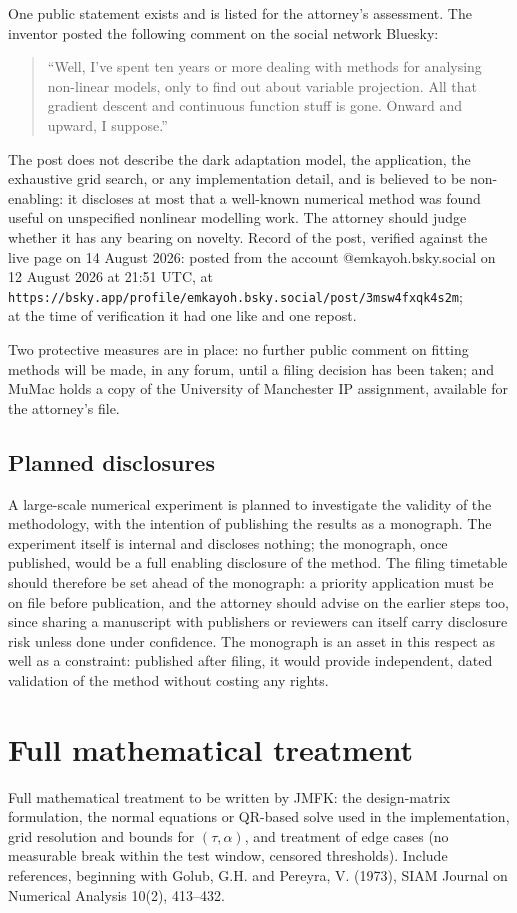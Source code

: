 \documentclass[11pt,a4paper]{article}
\begin{document}
One public statement exists and is listed for the attorney's assessment.
The inventor posted the following comment on the social network Bluesky:
\begin{quote}
``Well, I've spent ten years or more dealing with methods for analysing
non-linear models, only to find out about variable projection. All that
gradient descent and continuous function stuff is gone. Onward and
upward, I suppose.''
\end{quote}
The post does not describe the dark adaptation model, the application,
the exhaustive grid search, or any implementation detail, and is believed
to be non-enabling: it discloses at most that a well-known numerical
method was found useful on unspecified nonlinear modelling work. The
attorney should judge whether it has any bearing on novelty. Record of
the post, verified against the live page on 14 August 2026: posted from
the account @emkayoh.bsky.social on 12 August 2026 at 21:51 UTC, at\\
\texttt{\small https://bsky.app/profile/emkayoh.bsky.social/post/3msw4fxqk4s2m};\\
at the time of verification it had one like and one repost.

Two protective measures are in place: no further public comment on
fitting methods will be made, in any forum, until a filing decision has
been taken; and MuMac holds a copy of the University of Manchester IP
assignment, available for the attorney's file.

\subsection{Planned disclosures}
A large-scale numerical experiment is planned to investigate the validity
of the methodology, with the intention of publishing the results as a
monograph. The experiment itself is internal and discloses nothing; the
monograph, once published, would be a full enabling disclosure of the
method. The filing timetable should therefore be set ahead of the
monograph: a priority application must be on file before publication, and
the attorney should advise on the earlier steps too, since sharing a
manuscript with publishers or reviewers can itself carry disclosure risk
unless done under confidence. The monograph is an asset in this respect
as well as a constraint: published after filing, it would provide
independent, dated validation of the method without costing any rights.

\appendix
\section{Full mathematical treatment}
\begin{todo}
Full mathematical treatment to be written by JMFK: the design-matrix
formulation, the normal equations or QR-based solve used in the
implementation, grid resolution and bounds for $(\tau,\alpha)$, and
treatment of edge cases (no measurable break within the test window,
censored thresholds). Include references, beginning with Golub, G.H. and
Pereyra, V. (1973), SIAM Journal on Numerical Analysis 10(2), 413--432.
\end{todo}
\end{document}
